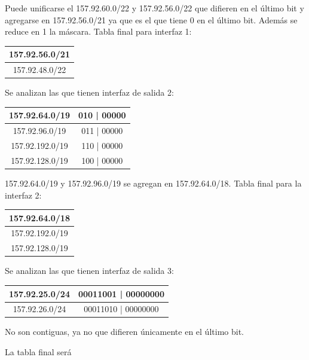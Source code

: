 \documentclass[titlepage,a4paper]{article}
\begin{document}
Puede unificarse el 157.92.60.0/22 y 157.92.56.0/22 que difieren en el último bit y agregarse en 157.92.56.0/21 ya que es el que tiene 0 en el último bit. Además se reduce en 1 la máscara. Tabla final para interfaz 1:

\begin{center}
    \begin{tabular}{c}

        157.92.56.0/21 \\
        \hline
        157.92.48.0/22
    \end{tabular}
\end{center}

Se analizan las que tienen interfaz de salida 2:

\begin{center}
    \begin{tabular}{c|c}
        157.92.64.0/19   & 010 | 00000 \\
        \hline
        157.92.96.0/19 &  011 | 00000 \\
        \hline
        157.92.192.0/19  &  110 | 00000 \\
        \hline
        157.92.128.0/19 & 100 | 00000
    \end{tabular}
\end{center}

157.92.64.0/19 y 157.92.96.0/19 se agregan en 157.92.64.0/18. Tabla final para la interfaz 2: 
\begin{center}
    \begin{tabular}{c}
        157.92.64.0/18 \\
        \hline
        157.92.192.0/19 \\
        \hline
        157.92.128.0/19
    \end{tabular}
\end{center}

Se analizan las que tienen interfaz de salida 3:


\begin{center}
    \begin{tabular}{c|c}
        157.92.25.0/24 & 00011001 | 00000000 \\
        \hline
        157.92.26.0/24 & 00011010 | 00000000 \\
    \end{tabular}
\end{center}

No son contiguas, ya no que difieren únicamente en el último bit.

La tabla final será
\end{document}

